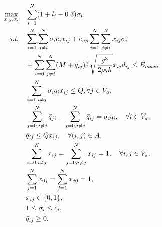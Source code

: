\documentclass[AutoFakeBold]{LZUThesis}
\begin{document}
\begin{subequations}\label{GRP}
	\begin{align}
		\max_{x_{ij}, \sigma_i} \quad & \sum_{i=1}^{N} (1+ l_i - 0.3) \sigma_i                                                                                                                         \\
		\emph{s.t.} \quad             & \sum^N_{i = 1}\sum^N_{j \neq i}\sigma_i e_i x_{ij} + e_{ap}\sum^N_{i=1}\sum^N_{j \neq i} x_{ij}\sigma_i \nonumber                                           \\
		                              & + \sum^N_{i=0}\sum^N_{j \neq i} (M + \bar{q}_{ij})^{\frac{3}{2}}\sqrt{\frac{g^3}{2 \rho \varsigma h}} x_{ij} d_{ij} \leq E_{max}, \label{energy-constraint} \\
		                              & \sum^N_{i=1, i\neq j} \sigma_i q_i x_{ij} \leq Q, \forall j \in V_a,\label{total-load}                                                                      \\
		                              & \sum^N_{j=0, i\neq j}\bar{q}_{ji} -  \sum^N_{j=0, i\neq j}\bar{q}_{ij} = \sigma_i q_i, \label{carry-load} \quad \forall i \in V_a,                          \\
		                              & \bar{q}_{ij} \leq Q x_{ij}, \quad \forall (i,j) \in A, \label{load}                                                                                         \\
		                              & \sum^N_{i=0, i\neq j} x_{ij} = \sum^N_{j=0,i\neq j} x_{ij} = 1, \quad \forall i,j \in V_a, \label{enter-point}                                              \\
		                              & \sum^N_{j=1} x_{0j} = \sum^N_{j=1} x_{j0} = 1, \label{start-point}                                                                                          \\
		                              & x_{ij} \in \{0,1\}, \label{binary-variable}                                                                                                                 \\
		                              & 1 \leq \sigma_i \leq c_i, \label{area-constraint}                                                                                                           \\
		                              & \bar{q}_{ij} \geq 0. \label{flight-weight}
	\end{align}
\end{subequations}
\end{document}
